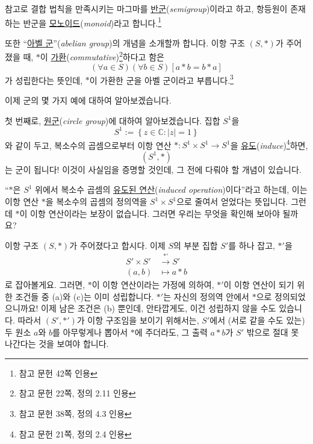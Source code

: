 \documentclass[12pt]{paper}
\begin{document}
  참고로 결합 법칙을 만족시키는 마그마를 \underline{반군}(\textit{semigroup})이라고 하고,
  항등원이 존재하는 반군을 \underline{모노이드}(\textit{monoid})라고 합니다.\footnote{참고 문헌 \cite{fraleigh2009} 42쪽 인용}

  또한 ``\underline{아벨 군}''(\textit{abelian group})의 개념을 소개할까 합니다.
  이항 구조 $\left( S , * \right)$가 주어졌을 때,
  $*$이 \underline{가환}(\textit{commutative})\footnote{참고 문헌 \cite{fraleigh2009} 22쪽, 정의 2.11 인용}하다고 함은
  \begin{equation*}
    \left( \forall a \in S \right) \left( \forall b \in S \right) \left[ a * b = b * a \right] \tag{4}
  \end{equation*}
  가 성립한다는 뜻인데,
  $*$이 가환한 군을 아벨 군이라고 부릅니다.\footnote{참고 문헌 \cite{fraleigh2009} 38쪽, 정의 4.3 인용}

  이제 군의 몇 가지 예에 대하여 알아보겠습니다.

  첫 번째로, \underline{원군}(\textit{circle group})에 대하여 알아보겠습니다.
  집합 $S^1$을
  \begin{equation*}
    S^1 := \left\{ z \in \mathbb{C} : \left| z \right| = 1 \right\} \tag{5}
  \end{equation*}
  와 같이 두고,
  복소수의 곱셈으로부터 이항 연산 $* : S^1 \times S^1 \to S^1$을 \underline{유도}(\textit{induce})\footnote{참고 문헌 \cite{fraleigh2009} 21쪽, 정의 2.4 인용}하면,
  $$\left( S^1 , * \right)$$는 군이 됩니다!
  이것이 사실임을 증명할 것인데, 그 전에 다뤄야 할 개념이 있습니다.

  ``$*$은 $S^1$ 위에서 복소수 곱셈의 \underline{유도된 연산}(\textit{induced operation})이다''라고 하는데,
  이는 이항 연산 $*$을 복소수의 곱셈의 정의역을 $S^1 \times S^1$으로 줄여서 얻었다는 뜻입니다.
  그런데 $*$이 이항 연산이라는 보장이 없습니다.
  그러면 우리는 무엇을 확인해 보아야 될까요?

  이항 구조 $\left( S , * \right)$가 주어졌다고 합시다.
  이제 $S$의 부분 집합 $S'$를 하나 잡고, $*'$을
  \begin{align*}
    S' \times S' & \xrightarrow{*'} S' \\
    \left( a , b \right) & \mapsto a * b
  \end{align*}
  로 잡아볼게요.
  그러면, $*$이 이항 연산이라는 가정에 의하여,
  $*'$이 이항 연산이 되기 위한 조건들 중 (a)와 (c)는 이미 성립합니다.
  $*'$는 자신의 정의역 안에서 $*$으로 정의되었으니까요!
  이제 남은 조건은 (b) 뿐인데, 안타깝게도, 이건 성립하지 않을 수도 있습니다.
  따라서 $\left( S' , *' \right)$가 이항 구조임을 보이기 위해서는,
  $S'$에서 (서로 같을 수도 있는) 두 원소 $a$와 $b$를 아무렇게나 뽑아서 $*$에 주더라도,
  그 출력 $a * b$가 $S'$ 밖으로 절대 못 나간다는 것을 보여야 합니다.
\end{document}
